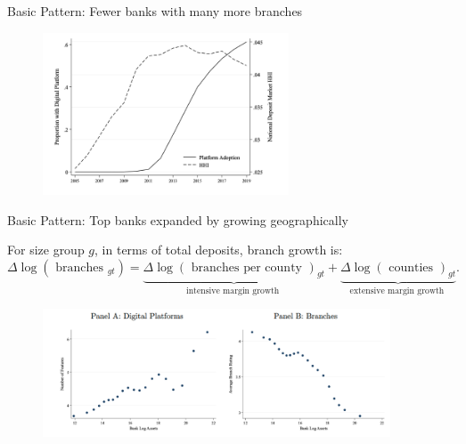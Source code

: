 \documentclass[notes,10pt, aspectratio=169]{beamer}
\begin{document}
    


\begin{frame}{Basic Pattern: Fewer banks with many more branches}

\begin{figure}
    \centering
    \includegraphics[width=0.65\textwidth]{imgs/fig1.png}
\end{figure}

\end{frame}

\begin{frame}{Basic Pattern: Top banks expanded by growing geographically}

    For size group $g$, in terms of total deposits, branch growth is:
$$
\Delta \log \left(\text { branches }_{g t}\right)=\underbrace{\Delta \log (\text { branches per county })_{g t}}_{\text {intensive margin growth }}+\underbrace{\Delta \log (\text { counties })_{g t}}_{\text {extensive margin growth }} .
$$

    \begin{figure}
        \centering
        \includegraphics[width=0.92\textwidth]{imgs/fig3.png}
        \label{fig:my_label}
    \end{figure}
    
    \end{frame}
\end{document}
